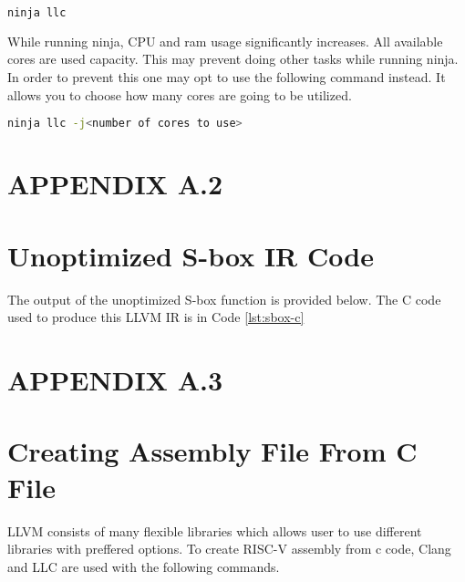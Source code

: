 \begin{minipage}[t]{\linewidth}
\begin{lstlisting}[language=Bash, caption={To build llc only which is the binary we modify}]
ninja llc	
\end{lstlisting}
\end{minipage}



While running ninja, CPU and ram usage significantly increases. All available cores are used capacity. This may prevent doing other tasks while running ninja. In order to prevent this one may opt to use the following command instead. It allows you to choose how many cores are going to be utilized.
\begin{lstlisting}[language=Bash]
	ninja llc -j<number of cores to use>
\end{lstlisting}

\newpage
\section*{APPENDIX A.2}
\renewcommand{\theequation}{A.2.\arabic{equation}}
\setcounter{equation}{0}
\section{Unoptimized S-box IR Code}
The output of the unoptimized S-box function is provided below. The C code used to produce this LLVM IR is in Code \ref{lst:sbox-c}



\newpage

\section*{APPENDIX A.3}
\renewcommand{\theequation}{A.2.\arabic{equation}}
\setcounter{equation}{0}

\section{Creating Assembly File From C File}

LLVM consists of many flexible libraries which allows user to use different libraries with preffered  options. To create RISC-V assembly from c code, Clang and LLC are used with the following commands. \\

